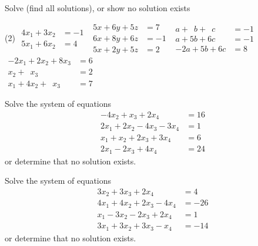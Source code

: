 \begin{exercise}\ansMark%
Solve (find all solutions), or show no solution exists
\begin{tasks}(2)
\task
$\begin{aligned}
4x_1+3x_2 & = -1 \\
5x_1+6x_2 & = 4
\end{aligned}$
\task
$\begin{aligned}
 5x+6y+5z & = 7 \\
 6x+8y+6z & = -1 \\
 5x+2y+5z & = 2
\end{aligned}$
\task
$\begin{aligned}
a+\phantom{5}b+\phantom{6}c & = -1 \\
a+5b+6c & = -1 \\
-2a+5b+6c & = 8
\end{aligned}$
\task
$\begin{aligned}
-2 x_1+2x_2+8x_3 & = 6 \\
x_2+\phantom{8}x_3 & = 2 \\
x_1+4x_2+\phantom{8}x_3 & = 7
\end{aligned}$
\end{tasks}
\end{exercise}

\begin{exercise}\ansMark%
Solve the system of equations
\begin{equation*}
\begin{split}
-4x_2 + x_3 + 2x_4 &= 16 \\
2x_1 + 2x_2 - 4x_3 - 3x_4 &= 1 \\
x_1 + x_2 + 2x_3 + 3x_4 &= 6 \\
2x_1 - 2x_3 + 4x_4 &= 24
\end{split}
\end{equation*}
or determine that no solution exists. 
\end{exercise}
%

\begin{exercise}\ansMark%
Solve the system of equations
\begin{equation*}
\begin{split}
3x_2 + 3x_3 + 2x_4 &= 4 \\
4x_1 + 4x_2 + 2x_3 - 4x_4 &= -26 \\
x_1 - 3x_2 -2x_3 + 2x_4 &= 1 \\
3x_1 + 3x_2 + 3x_3  - x_4 &= -14
\end{split}
\end{equation*}
or determine that no solution exists. 
\end{exercise}
%

